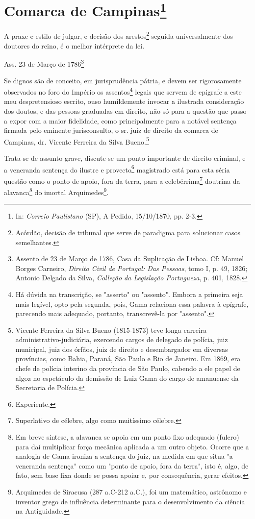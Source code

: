 \chapter{Comarca de Campinas\footnote[*]{In: \emph{Correio
  Paulistano} (SP), A Pedido, 15/10/1870, pp. 2-3.}}


A praxe e estilo de julgar, e decisão dos arestos\footnote{Acórdão,
  decisão de tribunal que serve de paradigma para solucionar casos
  semelhantes.} seguida universalmente dos doutores do reino, é o melhor
intérprete da lei.

Ass. 23 de Março de 1786\footnote{Assento de 23 de Março de 1786, Casa
  da Suplicação de Lisboa. Cf: Manuel Borges Carneiro, \emph{Direito
  Civil de Portugal: Das Pessoas}, tomo I, p. 49, 1826; Antonio Delgado
  da Silva, \emph{Colleção da Legislação Portugueza}, p. 401, 1828.}

Se dignos são de conceito, em jurisprudência pátria, e devem ser
rigorosamente observados no foro do Império os assentos\footnote{Há
  dúvida na transcrição, se "asserto" ou "assento". Embora a primeira
  seja mais legível, opto pela segunda, pois, Gama relaciona essa
  palavra à epígrafe, parecendo mais adequado, portanto, transcrevê-la
  por "assento".} legais que servem de epígrafe a este meu
despretensioso escrito, ouso humildemente invocar a ilustrada
consideração dos doutos, e das pessoas graduadas em direito, não só para
a questão que passo a expor com a maior fidelidade, como principalmente
para a notável sentença firmada pelo eminente jurisconsulto, o sr. juiz
de direito da comarca de Campinas, dr. Vicente Ferreira da Silva
Bueno.\footnote{Vicente Ferreira da Silva Bueno (1815-1873) teve longa
  carreira administrativo-judiciária, exercendo cargos de delegado de
  polícia, juiz municipal, juiz dos órfãos, juiz de direito e
  desembargador em diversas províncias, como Bahia, Paraná, São Paulo e
  Rio de Janeiro. Em 1869, era chefe de polícia interino da província de
  São Paulo, cabendo a ele papel de algoz no espetáculo da demissão de
  Luiz Gama do cargo de amanuense da Secretaria de Polícia.}

Trata-se de assunto grave, discute-se um ponto importante de direito
criminal, e a veneranda sentença do ilustre e provecto\footnote{
  Experiente.} magistrado está para esta séria questão como o ponto de
apoio, fora da terra, para a celebérrima\footnote{Superlativo de
  célebre, algo como muitíssimo célebre.} doutrina da alavanca\footnote{
  Em breve síntese, a alavanca se apoia em um ponto fixo adequado
  (fulcro) para daí multiplicar força mecânica aplicada a um outro
  objeto. Ocorre que a analogia de Gama ironiza a sentença do juiz, na
  medida em que situa "a veneranda sentença" como um "ponto de apoio,
  fora da terra", isto é, algo, de fato, sem base fixa donde se possa
  apoiar e, por consequência, gerar efeitos.} do imortal
Arquimedes\footnote{Arquimedes de Siracusa (287 a.C-212 a.C.), foi um
  matemático, astrônomo e inventor grego de influência determinante para
  o desenvolvimento da ciência na Antiguidade.}.

